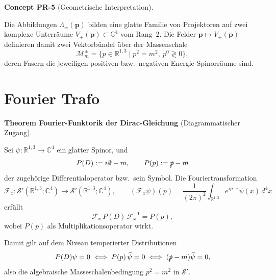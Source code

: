 \documentclass[10pt, letterpaper]{article}
\newcommand{\R}{\mathbb{R}}
\newcommand{\C}{\mathbb{C}}
\newcommand{\CustomHeading}[3]{%
  \par\medskip\noindent%
  \textbf{#1 #2} \textnormal{(#3)}.\enskip%
}
\newenvironment{THEO}[2]{\begin{unitbox}\CustomHeading{Theorem}{#1}{#2}}{\end{unitbox}}
\newenvironment{CONC}[2]{\begin{unitbox}\CustomHeading{Concept}{#1}{#2}}{\end{unitbox}}
\begin{document}
\begin{CONC}{PR-5}{Geometrische Interpretation}
Die Abbildungen $\Lambda_\pm(\mathbf p)$ bilden eine glatte Familie von Projektoren auf zwei komplexe Unterräume $V_\pm(\mathbf p)\subset\C^4$ vom Rang~2.  
Die Felder $\mathbf p\mapsto V_\pm(\mathbf p)$ definieren damit zwei Vektorbündel über der Massenschale
\[
\mathcal M_m^\pm=\{p\in\R^{1,3}\mid p^2=m^2,\ p^0\gtrless 0\},
\]
deren Fasern die jeweiligen positiven bzw.\ negativen Energie-Spinorräume sind.
\end{CONC}

\pagebreak

\section{Fourier Trafo}

\begin{THEO}{Fourier-Funktorik der Dirac-Gleichung}{Diagrammatischer Zugang}

Sei $\psi:\R^{1,3}\to\C^4$ ein glatter Spinor, und
\[
P(D):=i\slashed{\partial}-m,\qquad
P(p):=\slashed{p}-m
\]
der zugehörige Differentialoperator bzw.\ sein Symbol.
Die Fouriertransformation
\[
\mathcal{F}_x:\mathcal{S}'(\R^{1,3};\C^4)\longrightarrow \mathcal{S}'(\R^{1,3};\C^4),
\qquad
(\mathcal{F}_x\psi)(p)=\frac{1}{(2\pi)^2}\!\int_{\R^{1,3}}\!e^{ip\cdot x}\psi(x)\,d^4x
\]
erfüllt
\[
\mathcal{F}_x\,P(D)\,\mathcal{F}_x^{-1}=P(p),
\]
wobei $P(p)$ als Multiplikationsoperator wirkt.

\begin{center}
\end{center}

Damit gilt auf dem Niveau temperierter Distributionen
\[
P(D)\psi=0 \iff P(p)\,\widehat{\psi}=0
\iff (\slashed{p}-m)\widehat{\psi}=0,
\]
also die algebraische Masseschalenbedingung $p^2=m^2$ in $\mathcal{S}'$.
\end{THEO}


\end{document}
